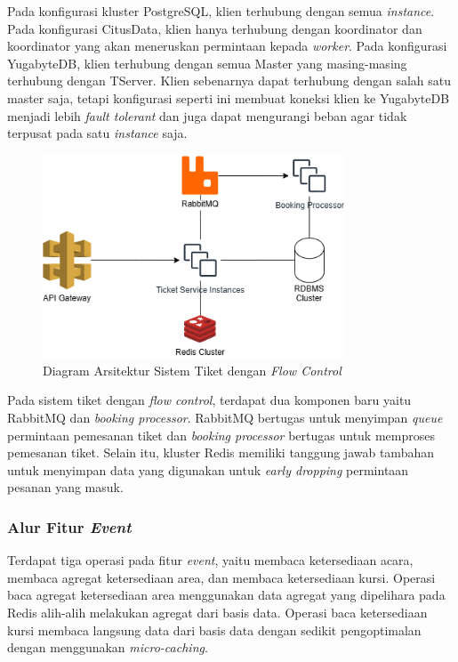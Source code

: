 Pada konfigurasi kluster PostgreSQL, klien terhubung dengan semua \textit{instance}. Pada konfigurasi CitusData, klien hanya terhubung dengan koordinator dan koordinator yang akan meneruskan permintaan kepada \textit{worker}. Pada konfigurasi YugabyteDB, klien terhubung dengan semua Master yang masing-masing terhubung dengan TServer. Klien sebenarnya dapat terhubung dengan salah satu master saja, tetapi konfigurasi seperti ini membuat koneksi klien ke YugabyteDB menjadi lebih \textit{fault tolerant} dan juga dapat mengurangi beban agar tidak terpusat pada satu \textit{instance} saja.

\begin{figure}[htbp]
    \centering
    \includegraphics[width=0.8\textwidth]{resources/chapter-3/ticket-fc.png}
    \caption{Diagram Arsitektur Sistem Tiket dengan \textit{Flow Control}}
    \label{fig:ticket-fc}
\end{figure}

Pada sistem tiket dengan \textit{flow control}, terdapat dua komponen baru yaitu RabbitMQ dan \textit{booking processor}. RabbitMQ bertugas untuk menyimpan \textit{queue} permintaan pemesanan tiket dan \textit{booking processor} bertugas untuk memproses pemesanan tiket. Selain itu, kluster Redis memiliki tanggung jawab tambahan untuk menyimpan data yang digunakan untuk \textit{early dropping} permintaan pesanan yang masuk.

\pagebreak

\subsubsection{Alur Fitur \textit{Event}}

Terdapat tiga operasi pada fitur \textit{event}, yaitu membaca ketersediaan acara, membaca agregat ketersediaan area, dan membaca ketersediaan kursi. Operasi baca agregat ketersediaan area menggunakan data agregat yang dipelihara pada Redis alih-alih melakukan agregat dari basis data. Operasi baca ketersediaan kursi membaca langsung data dari basis data dengan sedikit pengoptimalan dengan menggunakan \textit{micro-caching}.

